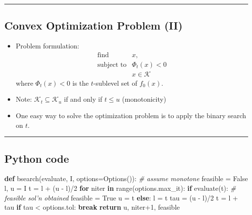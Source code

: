 \documentclass[]{article}
\newenvironment{Shaded}{}{}
\newcommand{\BuiltInTok}[1]{#1}
\newcommand{\CommentTok}[1]{\textcolor[rgb]{0.38,0.63,0.69}{\textit{#1}}}
\newcommand{\ControlFlowTok}[1]{\textcolor[rgb]{0.00,0.44,0.13}{\textbf{#1}}}
\newcommand{\DecValTok}[1]{\textcolor[rgb]{0.25,0.63,0.44}{#1}}
\newcommand{\KeywordTok}[1]{\textcolor[rgb]{0.00,0.44,0.13}{\textbf{#1}}}
\newcommand{\NormalTok}[1]{#1}
\newcommand{\OperatorTok}[1]{\textcolor[rgb]{0.40,0.40,0.40}{#1}}
\newcommand{\VariableTok}[1]{\textcolor[rgb]{0.10,0.09,0.49}{#1}}
\begin{document}
\begin{center}\rule{0.5\linewidth}{\linethickness}\end{center}

\hypertarget{convex-optimization-problem-ii}{%
\subsection{Convex Optimization Problem
(II)}\label{convex-optimization-problem-ii}}

\begin{itemize}
\item
  Problem formulation: \[\begin{array}{ll}
              \text{find}         & x, \\
              \text{subject to}   & \Phi_t(x) < 0 \\
                                  & x \in \mathcal{K}
    \end{array}\] where \(\Phi_t(x) < 0\) is the \(t\)-sublevel set of
  \(f_0(x)\).
\item
  Note: \(\mathcal{K}_t \subseteq \mathcal{K}_u\) if and only if
  \(t \leq u\) (monotonicity)
\item
  One easy way to solve the optimization problem is to apply the binary
  search on \(t\).
\end{itemize}

\begin{center}\rule{0.5\linewidth}{\linethickness}\end{center}

\hypertarget{python-code-1}{%
\subsection{Python code}\label{python-code-1}}

\begin{Shaded}
\begin{Highlighting}[]
\KeywordTok{def}\NormalTok{ bsearch(evaluate, I, options}\OperatorTok{=}\NormalTok{Options()):}
    \CommentTok{# assume monotone}
\NormalTok{    feasible }\OperatorTok{=} \VariableTok{False}
\NormalTok{    l, u }\OperatorTok{=}\NormalTok{ I}
\NormalTok{    t }\OperatorTok{=}\NormalTok{ l }\OperatorTok{+}\NormalTok{ (u }\OperatorTok{-}\NormalTok{ l)}\OperatorTok{/}\DecValTok{2}
    \ControlFlowTok{for}\NormalTok{ niter }\KeywordTok{in} \BuiltInTok{range}\NormalTok{(options.max_it):}
        \ControlFlowTok{if}\NormalTok{ evaluate(t):  }\CommentTok{# feasible sol'n obtained}
\NormalTok{            feasible }\OperatorTok{=} \VariableTok{True}
\NormalTok{            u }\OperatorTok{=}\NormalTok{ t}
        \ControlFlowTok{else}\NormalTok{:}
\NormalTok{            l }\OperatorTok{=}\NormalTok{ t}
\NormalTok{        tau }\OperatorTok{=}\NormalTok{ (u }\OperatorTok{-}\NormalTok{ l)}\OperatorTok{/}\DecValTok{2}
\NormalTok{        t }\OperatorTok{=}\NormalTok{ l }\OperatorTok{+}\NormalTok{ tau}
        \ControlFlowTok{if}\NormalTok{ tau }\OperatorTok{<}\NormalTok{ options.tol:}
            \ControlFlowTok{break}
    \ControlFlowTok{return}\NormalTok{ u, niter}\OperatorTok{+}\DecValTok{1}\NormalTok{, feasible}
\end{Highlighting}
\end{Shaded}
\end{document}
